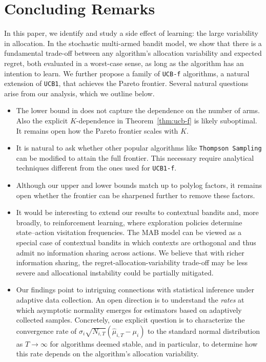 \documentclass[nonblindrev]{informs3_noinforms}
\begin{document}
\section{Concluding Remarks}\label{sec:conclusion}
In this paper, we identify and study a side effect of learning: the large variability in allocation. In the stochastic multi-armed bandit model, we show that there is a fundamental trade-off between any algorithm's allocation variability and expected regret, both evaluated in a worst-case sense, as long as the algorithm has an intention to learn. We further propose a family of \texttt{UCB-f} algorithms, a natural extension of \texttt{UCB1}, that achieves the Pareto frontier. Several natural questions arise from our analysis, which we outline below.
\begin{itemize}
    \item The lower bound in  does not capture the dependence on the number of arms. Also the explicit $K$-dependence in Theorem~\ref{thm:ucb-f} is likely suboptimal. It remains open how the Pareto frontier scales with $K$.
    \item It is natural to ask whether other popular algorithms like \texttt{Thompson Sampling} can be modified to attain the full frontier. This necessary require analytical techniques different from the ones used for \texttt{UCB1-f}.
    \item Although our upper and lower bounds match up to polylog factors, it remains open whether the frontier can be sharpened further to remove these factors. 
    \item It would be interesting to extend our results to contextual bandits and, more broadly, to reinforcement learning, where exploration policies determine state–action visitation frequencies. The MAB model can be viewed as a special case of contextual bandits in which contexts are orthogonal and thus admit no information sharing across actions. We believe that with richer information sharing, the regret-allocation-variability trade-off may be less severe and allocational instability could be partially mitigated.

    
    \item Our findings point to intriguing connections with statistical inference under adaptive data collection. An open direction is to understand the \emph{rates} at which asymptotic normality emerges for estimators based on adaptively collected samples. Concretely, one explicit question is to characterize the convergence rate of $\sigma_i\sqrt{N_{i,T}}(\hat\mu_{i,T}-\mu_i)$ to the standard normal distribution as $T\to\infty$ for algorithms deemed stable, and in particular, to determine how this rate depends on the algorithm's allocation variability.


\end{itemize}
   
\end{document}
